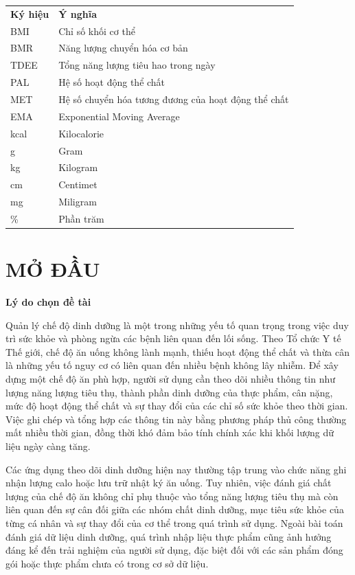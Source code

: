 \documentclass[12pt, a4paper]{report}
\begin{document}
\noindent
\begin{tabular}{>{\raggedright\arraybackslash}p{3cm} p{11cm}}
\textbf{Ký hiệu} & \textbf{Ý nghĩa} \\[0.2cm]
BMI & Chỉ số khối cơ thể \\[0.15cm]
BMR & Năng lượng chuyển hóa cơ bản \\[0.15cm]
TDEE & Tổng năng lượng tiêu hao trong ngày \\[0.15cm]
PAL & Hệ số hoạt động thể chất \\[0.15cm]
MET & Hệ số chuyển hóa tương đương của hoạt động thể chất \\[0.15cm]
EMA & Exponential Moving Average \\[0.15cm]
kcal & Kilocalorie \\[0.15cm]
g & Gram \\[0.15cm]
kg & Kilogram \\[0.15cm]
cm & Centimet \\[0.15cm]
mg & Miligram \\[0.15cm]
\% & Phần trăm \\
\end{tabular}
\clearpage
{}

\chapter*{MỞ ĐẦU}
\textbf{Lý do chọn đề tài}

Quản lý chế độ dinh dưỡng là một trong những yếu tố quan trọng trong việc duy trì sức khỏe và phòng ngừa các bệnh liên quan đến lối sống. Theo Tổ chức Y tế Thế giới, chế độ ăn uống không lành mạnh, thiếu hoạt động thể chất và thừa cân là những yếu tố nguy cơ có liên quan đến nhiều bệnh không lây nhiễm. Để xây dựng một chế độ ăn phù hợp, người sử dụng cần theo dõi nhiều thông tin như lượng năng lượng tiêu thụ, thành phần dinh dưỡng của thực phẩm, cân nặng, mức độ hoạt động thể chất và sự thay đổi của các chỉ số sức khỏe theo thời gian. Việc ghi chép và tổng hợp các thông tin này bằng phương pháp thủ công thường mất nhiều thời gian, đồng thời khó đảm bảo tính chính xác khi khối lượng dữ liệu ngày càng tăng.

Các ứng dụng theo dõi dinh dưỡng hiện nay thường tập trung vào chức năng ghi nhận lượng calo hoặc lưu trữ nhật ký ăn uống. Tuy nhiên, việc đánh giá chất lượng của chế độ ăn không chỉ phụ thuộc vào tổng năng lượng tiêu thụ mà còn liên quan đến sự cân đối giữa các nhóm chất dinh dưỡng, mục tiêu sức khỏe của từng cá nhân và sự thay đổi của cơ thể trong quá trình sử dụng. Ngoài bài toán đánh giá dữ liệu dinh dưỡng, quá trình nhập liệu thực phẩm cũng ảnh hưởng đáng kể đến trải nghiệm của người sử dụng, đặc biệt đối với các sản phẩm đóng gói hoặc thực phẩm chưa có trong cơ sở dữ liệu.
\end{document}
